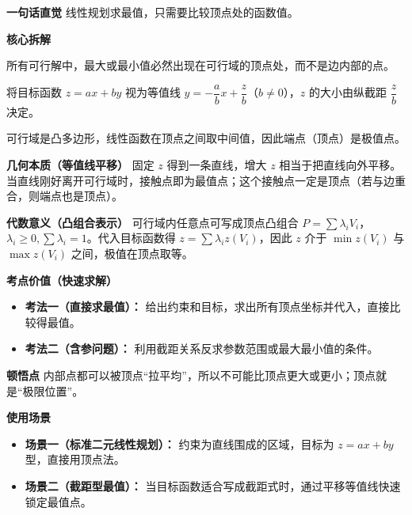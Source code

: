 \begin{explanationbox}
	\textbf{\textcolor{CExplanation}{一句话直觉}}
	线性规划求最值，只需要比较顶点处的函数值。

	\medskip
	\textbf{\textcolor{CExplanation}{核心拆解}}
	\begin{description}[style=nextline, leftmargin=2.8em, labelsep=0.5em, itemsep=0.45em]
		\item[\textbf{要点一（顶点最值）：}]
			所有可行解中，最大或最小值必然出现在可行域的顶点处，而不是边内部的点。
		\item[\textbf{要点二（截距关系）：}]
			将目标函数 $z=ax+by$ 视为等值线 $y = -\dfrac{a}{b}x + \dfrac{z}{b}$（$b\neq 0$），$z$ 的大小由纵截距 $\dfrac{z}{b}$ 决定。
		\item[\textbf{要点三（凸性原理）：}]
			可行域是凸多边形，线性函数在顶点之间取中间值，因此端点（顶点）是极值点。
	\end{description}

	\medskip
	\textbf{\textcolor{CExplanation}{几何本质（等值线平移）}}
	固定 $z$ 得到一条直线，增大 $z$ 相当于把直线向外平移。当直线刚好离开可行域时，接触点即为最值点；这个接触点一定是顶点（若与边重合，则端点也是顶点）。

	\medskip
	\textbf{\textcolor{CExplanation}{代数意义（凸组合表示）}}
	可行域内任意点可写成顶点凸组合 $P = \sum \lambda_i V_i$，$\lambda_i \geq 0, \sum \lambda_i =1$。代入目标函数得 $z = \sum \lambda_i z(V_i)$，因此 $z$ 介于 $\min z(V_i)$ 与 $\max z(V_i)$ 之间，极值在顶点取等。

	\medskip
	\textbf{\textcolor{CExplanation}{考点价值（快速求解）}}
	\begin{itemize}[leftmargin=*, itemsep=0.5em, topsep=0.4em]
		\item \textbf{考法一（直接求最值）：} 给出约束和目标，求出所有顶点坐标并代入，直接比较得最值。
		\item \textbf{考法二（含参问题）：} 利用截距关系反求参数范围或最大最小值的条件。
	\end{itemize}

	\medskip
	\textbf{\textcolor{CExplanation}{顿悟点}}
	内部点都可以被顶点“拉平均”，所以不可能比顶点更大或更小；顶点就是“极限位置”。

	\medskip
	\textbf{\textcolor{CExplanation}{使用场景}}
	\begin{itemize}[leftmargin=*, itemsep=0.5em, topsep=0.4em]
		\item \textbf{场景一（标准二元线性规划）：} 约束为直线围成的区域，目标为 $z=ax+by$ 型，直接用顶点法。
		\item \textbf{场景二（截距型最值）：} 当目标函数适合写成截距式时，通过平移等值线快速锁定最值点。
	\end{itemize}

\end{explanationbox}
